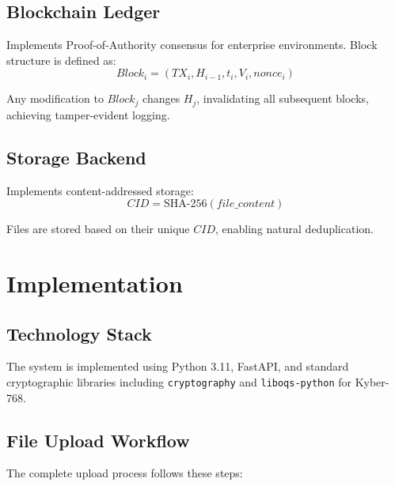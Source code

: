 \documentclass[conference]{IEEEtran}
\begin{document}
\subsection{Blockchain Ledger}
Implements Proof-of-Authority consensus for enterprise environments. Block structure is defined as:
\begin{equation}
\label{eq:block}
Block_i = (TX_i, H_{i-1}, t_i, V_i, nonce_i)
\end{equation}

Any modification to $Block_j$ changes $H_j$, invalidating all subsequent blocks, achieving tamper-evident logging.

\subsection{Storage Backend}
Implements content-addressed storage:
\begin{equation}
\label{eq:cid}
CID = \text{SHA-256}(file\_content)
\end{equation}

Files are stored based on their unique $CID$, enabling natural deduplication.

\section{Implementation}

\subsection{Technology Stack}
The system is implemented using Python 3.11, FastAPI, and standard cryptographic libraries including \texttt{cryptography} and \texttt{liboqs-python} for Kyber-768.

\subsection{File Upload Workflow}
The complete upload process follows these steps:
\end{document}
